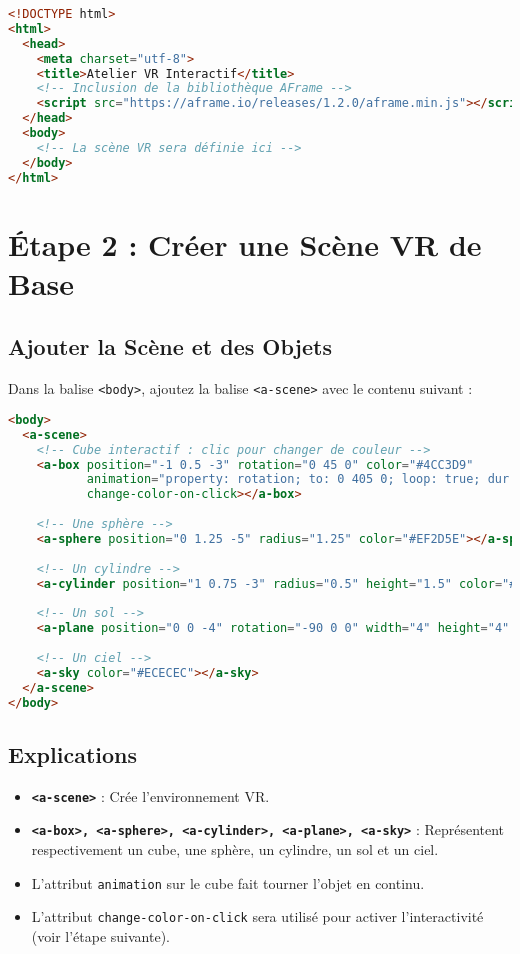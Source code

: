\documentclass[12pt]{article}
\begin{document}
\begin{lstlisting}[language=HTML]
<!DOCTYPE html>
<html>
  <head>
    <meta charset="utf-8">
    <title>Atelier VR Interactif</title>
    <!-- Inclusion de la bibliothèque AFrame -->
    <script src="https://aframe.io/releases/1.2.0/aframe.min.js"></script>
  </head>
  <body>
    <!-- La scène VR sera définie ici -->
  </body>
</html>
\end{lstlisting}

\section{Étape 2 : Créer une Scène VR de Base}
\subsection{Ajouter la Scène et des Objets}
Dans la balise \texttt{<body>}, ajoutez la balise \texttt{<a-scene>} avec le contenu suivant :

\begin{lstlisting}[language=HTML]
<body>
  <a-scene>
    <!-- Cube interactif : clic pour changer de couleur -->
    <a-box position="-1 0.5 -3" rotation="0 45 0" color="#4CC3D9"
           animation="property: rotation; to: 0 405 0; loop: true; dur: 4000"
           change-color-on-click></a-box>
    
    <!-- Une sphère -->
    <a-sphere position="0 1.25 -5" radius="1.25" color="#EF2D5E"></a-sphere>
    
    <!-- Un cylindre -->
    <a-cylinder position="1 0.75 -3" radius="0.5" height="1.5" color="#FFC65D"></a-cylinder>
    
    <!-- Un sol -->
    <a-plane position="0 0 -4" rotation="-90 0 0" width="4" height="4" color="#7BC8A4"></a-plane>
    
    <!-- Un ciel -->
    <a-sky color="#ECECEC"></a-sky>
  </a-scene>
</body>
\end{lstlisting}

\subsection{Explications}
\begin{itemize}
    \item \textbf{\texttt{<a-scene>}} : Crée l'environnement VR.
    \item \textbf{\texttt{<a-box>, <a-sphere>, <a-cylinder>, <a-plane>, <a-sky>}} : Représentent respectivement un cube, une sphère, un cylindre, un sol et un ciel.
    \item L'attribut \texttt{animation} sur le cube fait tourner l'objet en continu.
    \item L'attribut \texttt{change-color-on-click} sera utilisé pour activer l'interactivité (voir l'étape suivante).
\end{itemize}
\end{document}
